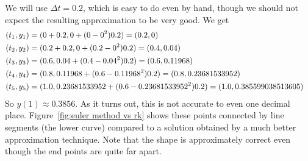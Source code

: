 \begin{solution}
We will use $\Delta t=0.2$, which is
easy to do even by hand, though we should not expect the resulting
approximation to be very good. We get
\begin{eqnarray*}
(t_1,y_1)&=(0+0.2,0+(0-0^2)0.2) = (0.2,0)\cr
(t_2,y_2)&=(0.2+0.2,0+(0.2-0^2)0.2) = (0.4,0.04)\cr
(t_3,y_3)&=(0.6,0.04+(0.4-0.04^2)0.2) = (0.6,0.11968)\cr
(t_4,y_4)&=(0.8,0.11968+(0.6-0.11968^2)0.2) = (0.8,0.23681533952)\cr
(t_5,y_5)&=(1.0,0.23681533952+(0.6-0.23681533952^2)0.2) = (1.0,0.385599038513605)
\end{eqnarray*}
So $y(1)\approx 0.3856$. As it turns out, this is not accurate to
even one decimal place. Figure~\ref{fig:euler method vs rk} shows
these points connected by line segments (the lower curve) compared to
a solution obtained by a much better approximation technique. Note
that the shape is approximately correct even though the end points are
quite far apart.


\end{solution}
